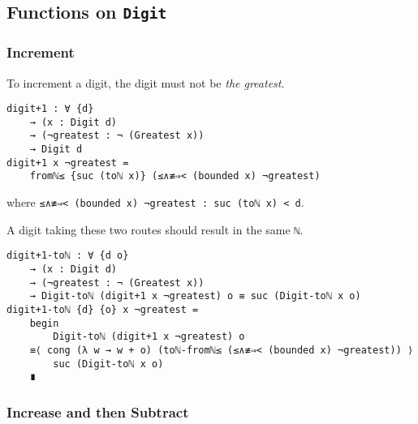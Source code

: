 \documentclass[\main/thesis.tex]{subfiles}
\begin{document}
\subsection{Functions on \lstinline|Digit|}

\subsubsection{Increment}

To increment a digit, the digit must not be \textit{the greatest}.

\begin{lstlisting}
digit+1 : ∀ {d}
    → (x : Digit d)
    → (¬greatest : ¬ (Greatest x))
    → Digit d
digit+1 x ¬greatest =
    fromℕ≤ {suc (toℕ x)} (≤∧≢⇒< (bounded x) ¬greatest)
\end{lstlisting}
%
where {\lstinline|≤∧≢⇒< (bounded x) ¬greatest : suc (toℕ x) < d|}.

\begin{center}
\end{center}

A digit taking these two routes should result in the same {{\lstinline|ℕ|}}.

\begin{lstlisting}[basicstyle=\ttfamily\scriptsize]
digit+1-toℕ : ∀ {d o}
    → (x : Digit d)
    → (¬greatest : ¬ (Greatest x))
    → Digit-toℕ (digit+1 x ¬greatest) o ≡ suc (Digit-toℕ x o)
digit+1-toℕ {d} {o} x ¬greatest =
    begin
        Digit-toℕ (digit+1 x ¬greatest) o
    ≡⟨ cong (λ w → w + o) (toℕ-fromℕ≤ (≤∧≢⇒< (bounded x) ¬greatest)) ⟩
        suc (Digit-toℕ x o)
    ∎
\end{lstlisting}

\subsubsection{Increase and then Subtract}
\end{document}
